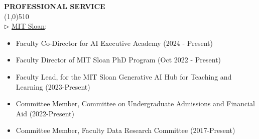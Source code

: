 \documentclass[11pt]{article}
\begin{document}

\vskip 0.5cm
\setlength{\parindent}{0in}
{\bf PROFESSIONAL SERVICE\\}
\vskip -0.85cm \line(1,0){510} \\ \vskip -0.15cm
$\triangleright$ \underline{MIT Sloan}: 
\vspace*{-.07in}
\begin{itemize} 
  \item Faculty Co-Director for AI Executive Academy (2024 - Present)
  \vspace*{-.07in}
  \item Faculty Director of MIT Sloan PhD Program (Oct 2022 - Present)
\vspace*{-.07in}
    \item Faculty Lead, for the MIT Sloan Generative AI Hub for Teaching and Learning  (2023-Present)
\vspace*{-.07in}
    \item Committee Member, Committee on Undergraduate Admissions and Financial Aid (2022-Present)
\vspace*{-.07in}
		\item Committee Member, Faculty Data Research Committee (2017-Present)
	\end{itemize}

\end{document}
